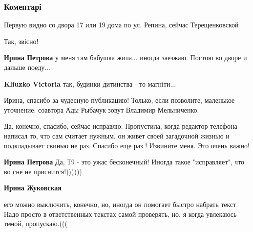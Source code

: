  
 
 
 
 
\subsubsection{Коментарі}

\begin{itemize} %
Первую видно со двора 17 или 19 дома по ул. Репина, сейчас Терещенковской

\begin{itemize} %
Так, звісно!

\textbf{Ирина Петрова} у меня там бабушка жила... иногда заезжаю. Постою во дворе и дальше поеду...

\textbf{Kliuzko Victoria} так, будинки дитинства - то магніти...
\end{itemize} %


Ирина, спасибо за чудесную публикацию! Только, если позволите, маленькое
уточнение: соавтора Ады Рыбачук зовут Владимир Мельниченко.

\begin{itemize} %

Да, конечно, спасибо, сейчас исправлю. Пропустила, когда редактор телефона
написал то, что сам считает нужным. он живет своей загадочной жизнью и
подкладывает свинью не раз. Спасибо еще раз ! Извините меня. Это очень важно!

\textbf{Ирина Петрова} Да, Т9 - это ужас бесконечный! Иногда такое "исправляет", что во сне не приснится!))))))

\textbf{Ирина Жуковская} 

его можно выключить, конечно, но, иногда он помогает быстро набрать текст. Надо
просто в ответственных текстах самой проверять, но, я когда увлекаюсь темой,
пропускаю.(((

\end{itemize} %



\end{itemize}

